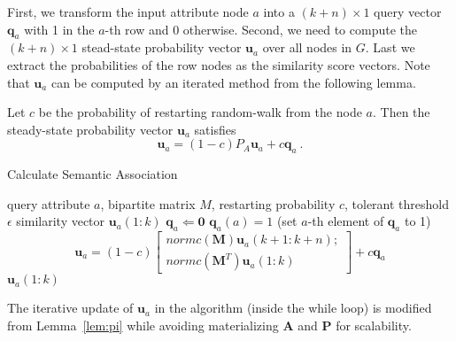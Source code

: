First, we transform the input attribute node $a$ into a $(k+n) \times 1$ query vector $\mathbf{q}_a$ with 1 in the $a$-th row and 0 otherwise. Second, we need to compute the $(k+n)\times 1$ stead-state probability vector $\mathbf{u}_a$ over all nodes in $G$. Last we extract the probabilities of the row nodes as the similarity score vectors. Note that $\mathbf{u}_a$ can be computed by an iterated method from the following lemma.

\begin{mylem}\label{lem:pi}
Let $c$ be the probability of restarting random-walk from the node $a$. Then the steady-state probability vector $\mathbf{u}_a$ satisfies
\begin{equation}
\mathbf{u}_a=(1-c)P_A\mathbf{u}_a+c\mathbf{q}_a~.
\end{equation}
\end{mylem}

\renewcommand{\algorithmicrequire}{\textbf{Input:}}
\renewcommand{\algorithmicensure}{\textbf{Output:}}
\begin{algorithm}
\caption{Calculate Semantic Association}
\label{alg1}
\begin{algorithmic}
\REQUIRE query attribute $a$, bipartite matrix $M$, restarting probability $c$, tolerant threshold $\epsilon$
\ENSURE similarity vector $\mathbf{u}_a(1:k)$
\STATE $\mathbf{q}_a \Leftarrow \mathbf{0}$
\STATE $\mathbf{q}_a(a)=1$ (set $a$-th element of $\mathbf{q}_a$ to 1)
\STATE \[
    \mathbf{u}_a = (1-c)  \left[ \begin{array}{c}
        normc(\mathbf{M})\mathbf{u}_a(k+1:k+n);\\
        normc(\mathbf{M}^T)\mathbf{u}_a(1:k)
    \end{array} \right] + c\mathbf{q}_a
\]
\ENDWHILE
\RETURN $\mathbf{u}_a(1:k)$
\end{algorithmic}
\end{algorithm}

The iterative update of $\mathbf{u}_a$ in the algorithm (inside the while loop) is modified from Lemma~\ref{lem:pi} while avoiding materializing $\mathbf{A}$ and $\mathbf{P}$ for scalability.


